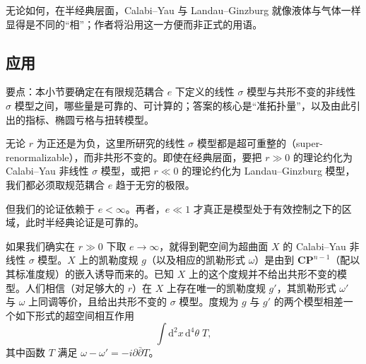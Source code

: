 无论如何，在半经典层面，Calabi--Yau 与 Landau--Ginzburg 就像液体与气体一样显得是不同的“相”；作者将沿用这一方便而非正式的用语。

\subsection{应用}

要点：本小节要确定在有限规范耦合 $e$ 下定义的线性 $\sigma$ 模型与共形不变的非线性 $\sigma$ 模型之间，哪些量是可靠的、可计算的；答案的核心是“准拓扑量”，以及由此引出的指标、椭圆亏格与扭转模型。

无论 $r$ 为正还是为负，这里所研究的线性 $\sigma$ 模型都是超可重整的（super-renormalizable），而非共形不变的。即使在经典层面，要把 $r\gg0$ 的理论约化为 Calabi--Yau 非线性 $\sigma$ 模型，或把
\label{op:30}
$r\ll0$ 的理论约化为 Landau--Ginzburg 模型，我们都必须取规范耦合 $e$ 趋于无穷的极限。

但我们的论证依赖于 $e<\infty$。再者，$e\ll1$ 才真正是模型处于有效控制之下的区域，此时半经典论证是可靠的。


如果我们确实在 $r\gg0$ 下取 $e\to\infty$，就得到靶空间为超曲面 $X$ 的 Calabi--Yau 非线性 $\sigma$ 模型。$X$ 上的凯勒度规 $g$（以及相应的凯勒形式 $\omega$）是由到 $\mathbf{CP}^{n-1}$（配以其标准度规）的嵌入诱导而来的。已知 $X$ 上的这个度规并不给出共形不变的模型。人们相信（对足够大的 $r$）在 $X$ 上存在唯一的凯勒度规 $g'$，其凯勒形式 $\omega'$ 与 $\omega$ 上同调等价，且给出共形不变的 $\sigma$ 模型。度规为 $g$ 与 $g'$ 的两个模型相差一个如下形式的超空间相互作用
\begin{equation}
\tag{3.24}
\int \mathrm{d}^{2}x\,\mathrm{d}^{4}\theta\; T,
\end{equation}
其中函数 $T$ 满足 $\omega-\omega'=-i\partial\bar\partial T$。


